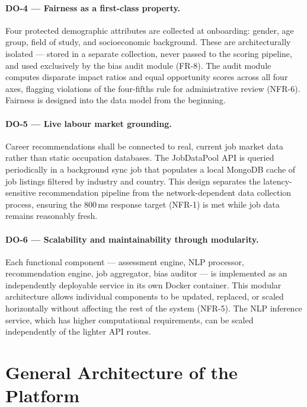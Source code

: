 \paragraph{DO-4 --- Fairness as a first-class property.}
Four protected demographic attributes are collected at onboarding: gender, age
group, field of study, and socioeconomic background. These are architecturally
isolated --- stored in a separate collection, never passed to the scoring
pipeline, and used exclusively by the bias audit module (FR-8). The audit
module computes disparate impact ratios and equal opportunity scores across all
four axes, flagging violations of the four-fifths rule for administrative review
(NFR-6). Fairness is designed into the data model from the beginning.

\paragraph{DO-5 --- Live labour market grounding.}
Career recommendations shall be connected to real, current job market data
rather than static occupation databases. The JobDataPool API is queried
periodically in a background sync job that populates a local MongoDB cache
of job listings filtered by industry and country. This design separates the
latency-sensitive recommendation pipeline from the network-dependent data
collection process, ensuring the 800\,ms response target (NFR-1) is met while
job data remains reasonably fresh.

\paragraph{DO-6 --- Scalability and maintainability through modularity.}
Each functional component --- assessment engine, NLP processor, recommendation
engine, job aggregator, bias auditor --- is implemented as an independently
deployable service in its own Docker container. This modular architecture
allows individual components to be updated, replaced, or scaled horizontally
without affecting the rest of the system (NFR-5). The NLP inference service,
which has higher computational requirements, can be scaled independently of
the lighter API routes.

\section{General Architecture of the Platform}
\label{sec:architecture}

